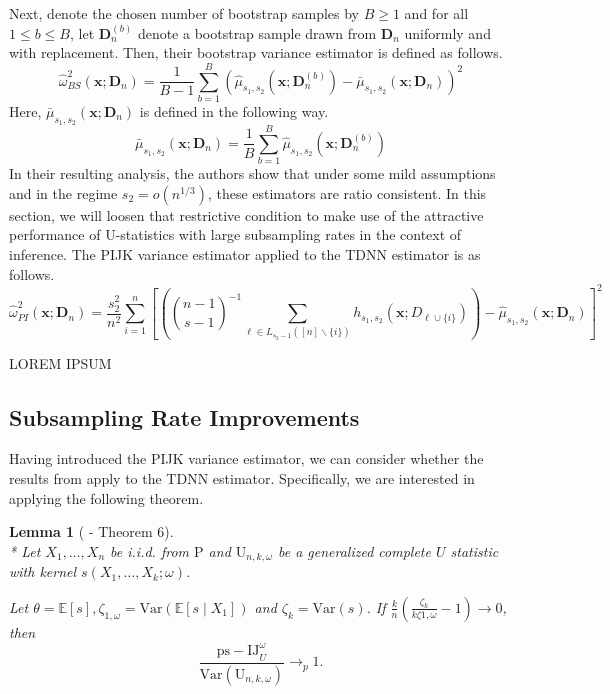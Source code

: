 \documentclass[letterpaper,10pt]{article}
\numberwithin{equation}{section}
\numberwithin{thm}{section}
\newtheorem{lem}{Lemma}
\numberwithin{lem}{section}
\numberwithin{cor}{section}
\renewcommand{\hat}{\widehat}
\newcommand{\E}{\mathbb{E}}
\newcommand{\1}{\mathbbm{1}}
\newcommand{\Var}{\text{Var}}
\begin{document}
Next, denote the chosen number of bootstrap samples by $B \geq 1$ and for all $1 \leq b \leq B$, let $\mathbf{D}^{(b)}_n$ denote a bootstrap sample drawn from $\mathbf{D}_n$ uniformly and with replacement.
Then, their bootstrap variance estimator is defined as follows.
\begin{equation}\label{eq:BS_Var_Est}
	\hat{\omega}_{BS}^2\left(\mathbf{x}; \mathbf{D}_n\right)
	= \frac{1}{B - 1}\sum_{b = 1}^{B} \left(\hat{\mu}_{s_1, s_2}\left(\mathbf{x}; \mathbf{D}_{n}^{(b)}\right) - \bar{\mu}_{s_1, s_2}\left(\mathbf{x}; \mathbf{D}_{n}\right)\right)^2
\end{equation}
Here, $\bar{\mu}_{s_1, s_2}\left(\mathbf{x}; \mathbf{D}_{n}\right)$ is defined in the following way.
\begin{equation}
	\bar{\mu}_{s_1, s_2}\left(\mathbf{x}; \mathbf{D}_{n}\right)
	= \frac{1}{B} \sum_{b = 1}^{B} \hat{\mu}_{s_1, s_2}\left(\mathbf{x}; \mathbf{D}_{n}^{(b)}\right)
\end{equation}
In their resulting analysis, the authors show that under some mild assumptions and in the regime $s_2 = o(n^{1/3})$, these estimators are ratio consistent.
In this section, we will loosen that restrictive condition to make use of the attractive performance of U-statistics with large subsampling rates in the context of inference.
The PIJK variance estimator applied to the TDNN estimator is as follows.
\begin{equation}\label{eq:PIJK_Var_Est}
	\hat{\omega}_{PI}^2\left(\mathbf{x}; \mathbf{D}_n\right)
	= \frac{s_2^2}{n^2}\sum_{i = 1}^{n}\left[\left(
		\binom{n-1}{s-1}^{-1} \sum_{\ell \in L_{s_2-1}([n]\backslash\{i\})} h_{s_1, s_2}\left(\mathbf{x}; D_{\ell \cup \{i\}}\right)\right)
		- \hat{\mu}_{s_1, s_2}\left(\mathbf{x}; \mathbf{D}_n\right)\right]^2
\end{equation}

{\color{red} LOREM IPSUM}

\subsection{Subsampling Rate Improvements}

Having introduced the PIJK variance estimator, we can consider whether the results from \citet{peng_bias_2021} apply to the TDNN estimator.
Specifically, we are interested in applying the following theorem.
\begin{lem}[\citet{peng_bias_2021} - Theorem 6]\label{thm:peng21_6}\mbox{}\\*
	Let $X_1, \ldots, X_n$ be i.i.d. from $\mathrm{P}$ and $\mathrm{U}_{n, k, \omega}$ be a generalized complete $U$ statistic with kernel $s\left(X_1, \ldots, X_k ; \omega\right)$.

	Let $\theta=\E[s], \zeta_{1, \omega}=\Var\left(\E\left[s \mid X_1\right]\right)$ and $\zeta_k=\Var(s)$.
	If $\frac{k}{n}\left(\frac{\zeta_k}{k \zeta 1, \omega}-1\right) \rightarrow 0$, then
	\begin{equation}
		\frac{\mathrm{ps-IJ}_{U}^\omega}{\Var\left(\mathrm{U}_{n, k, \omega}\right)}
		\longrightarrow_{p} 1 .
	\end{equation}
\end{lem}
\end{document}
